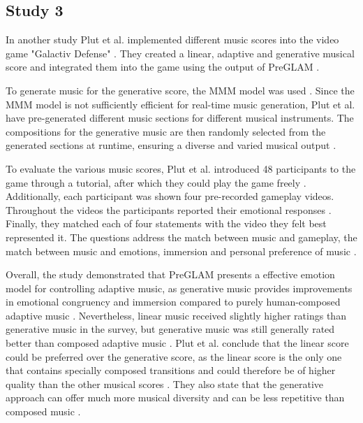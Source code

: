 \subsection{Study 3}
In another study Plut et al. implemented different music scores into the video game "Galactiv Defense" \cite{plut2023preglam} \cite{plut2022preglam}. 
They created a linear, adaptive and generative musical score and integrated them into the game using the output of PreGLAM \cite{plut2023preglam} \cite{plut2022preglam}. 

To generate music for the generative score, the MMM model \cite{ens2020mmm} was used \cite{plut2022preglam}. Since the MMM model is not sufficiently efficient for real-time music generation, Plut et al. have pre-generated different music sections for different musical instruments. The compositions for the generative music are then randomly selected from the generated sections at runtime, ensuring a diverse and varied musical output \cite{plut2022preglam}.

To evaluate the various music scores, Plut et al. introduced 48 participants to the game through a tutorial, after which they could play the game freely \cite{plut2022preglam}. Additionally, each participant was shown four pre-recorded gameplay videos. Throughout the videos the participants reported their emotional responses \cite{plut2022preglam}. Finally, they matched each of four statements with the video they felt best represented it. The questions address the match between music and gameplay, the match between music and emotions, immersion and personal preference of music \cite{plut2022preglam}.

Overall, the study demonstrated that PreGLAM presents a effective emotion model for controlling adaptive music, as generative music provides improvements in emotional congruency and immersion compared to purely human-composed adaptive music \cite{plut2022preglam}.
Nevertheless, linear music received slightly higher ratings than generative music in the survey, but generative music was still generally rated better than composed adaptive music \cite{plut2022preglam}.
Plut et al. conclude that the linear score could be preferred over the generative score, as the linear score is the only one that contains specially composed transitions and could therefore be of higher quality than the other musical scores \cite{plut2022preglam}. 
They also state that the generative approach can offer much more musical diversity and can be less repetitive than composed music \cite{plut2022preglam}. 


